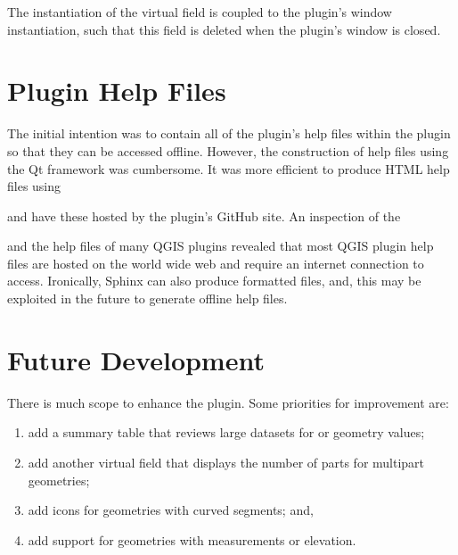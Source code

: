 \documentclass[a4paper,11pt,english]{sphinxmanual}
\begin{document}
The instantiation of the  virtual field is coupled to the plugin’s window instantiation, such that this field is deleted when the plugin’s window is closed.


\section{Plugin Help Files}
\label{\detokenize{pluginDesign:plugin-help-files}}
The initial intention was to contain all of the plugin’s help files within the plugin so that they can be accessed offline.  However, the construction of help files using the Qt framework was cumbersome.  It was more efficient to produce HTML help files using %
\begin{footnote}[15]\sphinxAtStartFootnote
{}
%
\end{footnote} and have these hosted by the plugin’s GitHub site.  An inspection of the %
\begin{footnote}[16]\sphinxAtStartFootnote
{}
%
\end{footnote} and the help files of many QGIS plugins revealed that most QGIS plugin help files are hosted on the world wide web and require an internet connection to access.  Ironically, Sphinx can also produce  formatted files, and, this may be exploited in the future to generate offline help files.


\section{Future Development}
\label{\detokenize{pluginDesign:future-development}}
There is much scope to enhance the plugin.  Some priorities for improvement are:
\begin{enumerate}
\def\theenumi{\arabic{enumi}}
\def\labelenumi{\theenumi .}
\makeatletter\def\p@enumii{\p@enumi \theenumi .}\makeatother
\item {} 
add a summary table that reviews large datasets for  or  geometry values;

\item {} 
add another virtual field that displays the number of parts for multipart geometries;

\item {} 
add icons for geometries with curved segments; and,

\item {} 
add support for geometries with measurements or elevation.

\end{enumerate}
\end{document}
